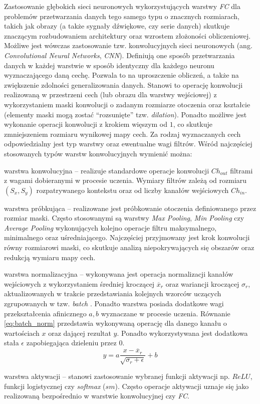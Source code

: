 Zastosowanie głębokich sieci neuronowych wykorzystujących warstwy \emph{FC} dla problemów przetwarzania danych tego samego typu o znacznych rozmiarach, takich jak obrazy (a także sygnały dźwiękowe, czy serie danych) skutkuje znaczącym rozbudowaniem architektury oraz wzrostem złożoności obliczeniowej. 
Możliwe jest wówczas zastosowanie tzw. konwolucyjnych sieci neuronowych (ang. \emph{Convolutional Neural Networks}, \emph{CNN}).
Definiują one sposób przetwarzania danych w każdej warstwie w sposób identyczny dla każdego neuronu wyznaczającego daną cechę.
Pozwala to na uproszczenie obliczeń, a także na zwiększenie zdolności generalizowania danych.
Stanowi to operację konwolucji realizowaną w przestrzeni cech (lub obrazu dla warstwy wejściowej) z wykorzystaniem maski konwolucji o zadanym rozmiarze otoczenia oraz kształcie (elementy maski mogą zostać ``rozsunięte'' tzw. \emph{dilation}). 
Ponadto możliwe jest wykonanie operacji konwolucji z krokiem więszym od $1$, co skutkuje zmniejszeniem rozmiaru wynikowej mapy cech.
Za rodzaj wyznaczanych cech odpowiedzialny jest typ warstwy oraz ewentualne wagi filtrów. 
Wśród najczęściej stosowanych typów warstw konwolucyjnych wymienić można:
\begin{description}
\item warstwa konwolucyjna -- realizuje standardowe operacje konwolucji $Ch_{out}$ filtrami z wagami dobieranymi w procesie uczenia. Wymiary filtrów zależą od rozmiaru $(S_x,S_y)$ rozpatrywanego kontekstu oraz od liczby kanałów wejściowych $Ch_{in}$. 
\item warstwa próbkująca -- realizowane jest próbkowanie otoczenia definiowanego przez rozmiar maski.
Często stosowanymi są warstwy \emph{Max Pooling}, \emph{Min Pooling} czy \emph{Average Pooling} wykonujących kolejno operacje filtru maksymalnego, minimalnego oraz uśredniającego. Najczęściej przyjmowany jest krok konwolucji równy rozmiarowi maski, co skutkuje analizą niepokrywających się obszarów oraz redukcją wymiaru mapy cech.
\item warstwa normalizacyjna -- wykonywana jest operacja normalizacji kanałów wejściowych z wykorzystaniem średniej kroczącej $\overline{x}_r$ oraz wariancji kroczącej $\sigma_r$, aktualizowanych w trakcie przedstawiania kolejnych wzorców uczących zgrupowanych w tzw. \emph{batch} .
Ponadto warstwa posiada dodatkowe wagi przekształcenia afinicznego $a, b$ wyznaczane w procesie uczenia.
Równanie \eqref{eq:batch_norm} przedstawia wykonywaną operację dla danego kanału o wartościach $x$ oraz dającej rezultat $y$. Ponadto wykorzystywana jest dodatkowa stała $\epsilon$ zapobiegająca dzieleniu przez $0$.  
\begin{equation}
y = a \frac{x-\overline{x}_r}{\sqrt{\sigma_r + \epsilon}} + b
\label{eq:batch_norm}
\end{equation}
\item warstwa aktywacji -- stanowi zastosowanie wybranej funkcji aktywacji np. $ReLU$, funkcji logistycznej czy \emph{softmax} ($sm$).
Często operacje aktywacji uznaje się jako realizowaną bezpośrednio w warstwie konwolucyjnej czy \emph{FC}.
\end{description}
